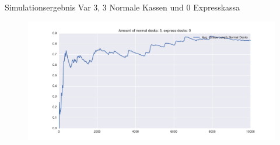 \begin{frame}[fragile]{Simulationsergebnis Var 3, 3 Normale Kassen und 0 Expresskassa}
    	\begin{figure}[h!]
    	\includegraphics[scale=0.4]{BSP30_Plot_3.pdf}
		\end{figure}
\end{frame}


